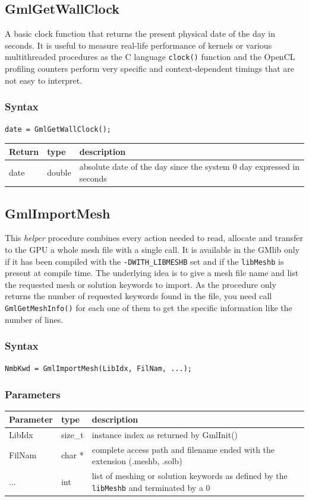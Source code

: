 \documentclass[a4paper,12pt]{article}
\begin{document}
\subsection{GmlGetWallClock}
A basic clock function that returns the present physical date of the day in seconds. It is useful to measure real-life performance of kernels or various multithreaded procedures as the C language {\tt clock()} function and the OpenCL profiling counters perform very specific and context-dependent timings that are not easy to interpret.

\subsubsection*{Syntax}
{\tt date = GmlGetWallClock();}

\begin{tabular}{|m{2cm}|m{1.5cm}|m{10.5cm}|}
\hline
Return     & type    & description \\
\hline
date       & double & absolute date of the day since the system 0 day expressed in seconds \\
\hline
\end{tabular}


\subsection{GmlImportMesh}
This \emph{helper} procedure combines every action needed to read, allocate and transfer to the GPU a whole mesh file with a single call. It is available in the GMlib only if it has been compiled with the {\tt -DWITH\_LIBMESHB} set and if the {\tt libMeshb} is present at compile time. The underlying idea is to give a mesh file name and list the requested mesh or solution keywords to import. As the procedure only returns the number of requested keywords found in the file, you need call {\tt GmlGetMeshInfo()} for each one of them to get the specific information like the number of lines.

\subsubsection*{Syntax}
{\tt NmbKwd = GmlImportMesh(LibIdx, FilNam, ...);}

\subsubsection*{Parameters}
\begin{tabular}{|m{2cm}|m{1.5cm}|m{10.5cm}|}
\hline
Parameter  & type    & description \\
\hline
LibIdx     & size\_t & instance index as returned by GmlInit() \\
\hline
FilNam     & char *  & complete access path and filename ended with the extension (.meshb, .solb) \\
\hline
...        & int     & list of meshing or solution keywords as defined by the {\tt libMeshb} and terminated by a 0 \\
\hline
\end{tabular}
\end{document}
